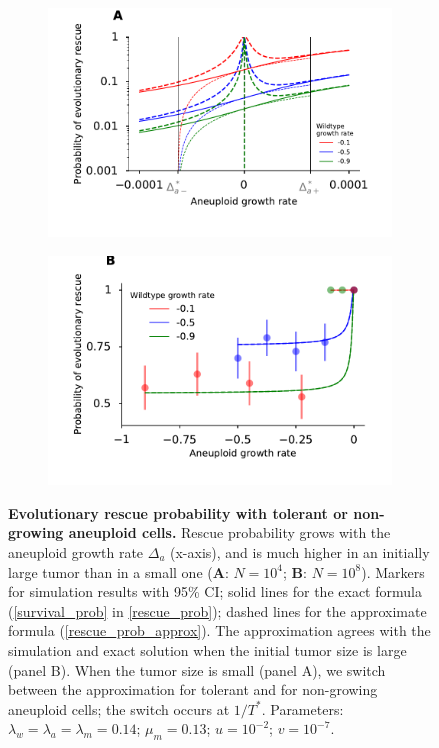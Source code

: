\documentclass[12pt]{extarticle}
\begin{document}
\begin{figure}
\begin{subfigure}{0.5\textwidth}
\includegraphics[width=1\textwidth]{Figures/P_est_divergence.pdf}
\end{subfigure}
\begin{subfigure}{0.5\textwidth}
\includegraphics[width=1\textwidth]{Figures/P_est_divergenceLargePopulation.pdf}
\end{subfigure}
\caption{\textbf{Evolutionary rescue probability with tolerant or non-growing aneuploid cells.}
Rescue probability grows with the aneuploid growth rate $\Delta_a$ (x-axis), and is much higher in an initially large tumor than in a small one (\textbf{A}: $N=10^4$; \textbf{B}: $N=10^8$). 
Markers for simulation results with 95\% CI; 
solid lines for the exact formula (\cref{survival_prob} in \cref{rescue_prob});
dashed lines for the approximate formula (\cref{rescue_prob_approx}).
The approximation agrees with the simulation and exact solution when the initial tumor size is large (panel B).
When the tumor size is small (panel A), we switch between the approximation for tolerant and for non-growing aneuploid cells; the switch occurs at $1/T^*$. %
Parameters: $\lambda_w=\lambda_a=\lambda_m=0.14$; $\mu_m=0.13$; $u=10^{-2}$; $v=10^{-7}$.
}
\label{rescue_prob_an_growth}
\end{figure}
\end{document}
